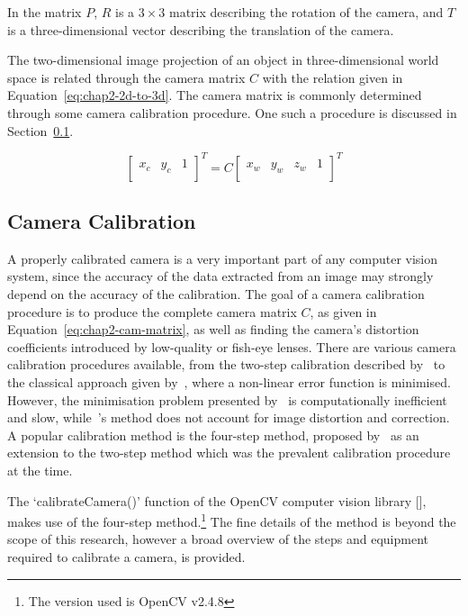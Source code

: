 In the matrix $P$, $R$ is a $3\times3$ matrix describing the rotation of the camera, and $T$ is a three-dimensional vector describing the translation of the camera. 

The two-dimensional image projection of an object in three-dimensional world space is related through the camera matrix $C$ with the relation given in Equation~\ref{eq:chap2-2d-to-3d}. The camera matrix is commonly determined through some camera calibration procedure. One such a procedure is discussed in Section~\ref{sec:chap2-cam-calibration}.

\begin{equation}
   \label{eq:chap2-2d-to-3d}
   \begin{bmatrix}
     x_c & y_c & 1 \\
   \end{bmatrix}^T
   = C
   \begin{bmatrix}
     x_w & y_w & z_w & 1 \\
   \end{bmatrix}^T
 \end{equation}

\subsection{Camera Calibration}
\label{sec:chap2-cam-calibration}

A properly calibrated camera is a very important part of any computer vision system, since the accuracy of the data extracted from an image may strongly depend on the accuracy of the calibration. The goal of a camera calibration procedure is to produce the complete camera matrix $C$, as given in Equation~\ref{eq:chap2-cam-matrix}, as well as finding the camera's distortion coefficients introduced by low-quality or fish-eye lenses. There are various camera calibration procedures available, from the two-step calibration described by~\cite{melen1994geometrical} to the classical approach given by~\cite{slama1980manual}, where a non-linear error function is minimised. However, the minimisation problem presented by~\citeauthor{slama1980manual} is computationally inefficient and slow, while~\citeauthor{melen1994geometrical}'s method does not account for image distortion and correction. A popular calibration method is the four-step method, proposed by~\cite{heikkila1997four} as an extension to the two-step method which was the prevalent calibration procedure at the time.

The `calibrateCamera()' function of the OpenCV computer vision library [\cite{bradski2000opencv}], makes use of the four-step method.\footnote{The version used is OpenCV v2.4.8} The fine details of the method is beyond the scope of this research, however a broad overview of the steps and equipment required to calibrate a camera, is provided. 


